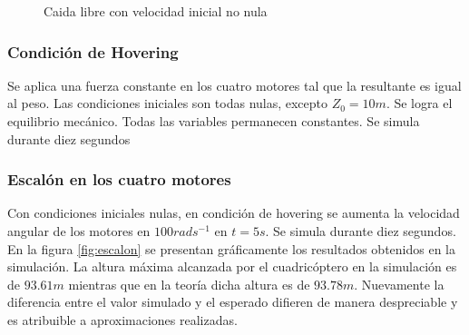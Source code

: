 \documentclass[main]{subfiles}
\begin{document}
\begin{figure} 
  \centering
 
  \caption{Caida libre con velocidad inicial no nula}
  \label{fig:caida_libre_vi}
\end{figure}


\subsubsection{Condici\'on de Hovering}

Se aplica una fuerza constante en los cuatro motores tal que la resultante es igual al peso. Las condiciones iniciales son todas nulas, excepto $Z_0=10m$. Se logra el equilibrio mec\'anico. Todas las variables permanecen constantes. Se simula durante diez segundos

\subsubsection{Escal\'on en los cuatro motores}
Con condiciones iniciales nulas, en condici\'on de hovering se aumenta la velocidad angular de los motores en $100 rads^{-1}$ en $t=5s$. Se simula durante diez segundos. En la figura \ref{fig:escalon} se presentan gr\'aficamente los resultados obtenidos en la simulaci\'on. La altura m\'axima alcanzada por el cuadric\'optero en la simulaci\'on es de $93.61m$ mientras que en la teor\'ia dicha altura es de $93.78m$. Nuevamente la diferencia entre el valor simulado y el esperado difieren de manera despreciable y es atribuible a aproximaciones realizadas.
\end{document}
